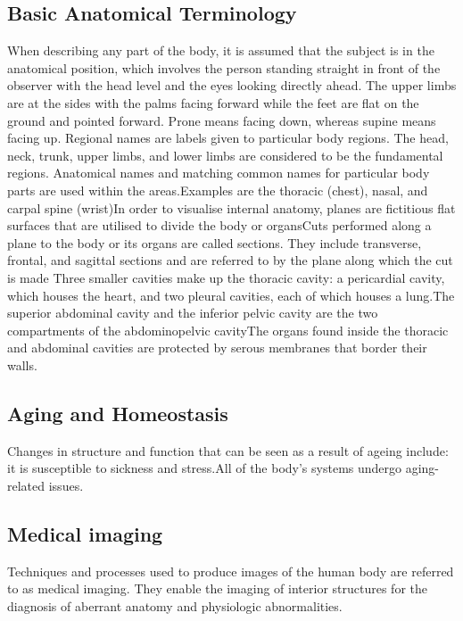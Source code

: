 \documentclass[12pt]{article}
\begin{document}
\subsection{Basic Anatomical Terminology}
When describing any part of the body, it is assumed that the subject is in the anatomical position, which involves the person standing straight in front of the observer with the head level and the eyes looking directly ahead. The upper limbs are at the sides with the palms facing forward while the feet are flat on the ground and pointed forward. Prone means facing down, whereas supine means facing up. Regional names are labels given to particular body regions. The head, neck, trunk, upper limbs, and lower limbs are considered to be the fundamental regions. Anatomical names and matching common names for particular body parts are used within the areas.Examples are the thoracic (chest), nasal, and carpal spine (wrist)In order to visualise internal anatomy, planes are fictitious flat surfaces that are utilised to divide the body or organsCuts performed along a plane to the body or its organs are called sections. They include transverse, frontal, and sagittal sections and are referred to by the plane along which the cut is made Three smaller cavities make up the thoracic cavity: a pericardial cavity, which houses the heart, and two pleural cavities, each of which houses a lung.The superior abdominal cavity and the inferior pelvic cavity are the two compartments of the abdominopelvic cavityThe organs found inside the thoracic and abdominal cavities are protected by serous membranes that border their walls.
\subsection{Aging and Homeostasis}
Changes in structure and function that can be seen as a result of ageing include: 
it is susceptible to sickness and stress.All of the body's systems undergo aging-related issues.
\subsection{Medical imaging}
Techniques and processes used to produce images of the human body are referred to as medical imaging. They enable the imaging of interior structures for the diagnosis of aberrant anatomy and physiologic abnormalities.
\end{document}
